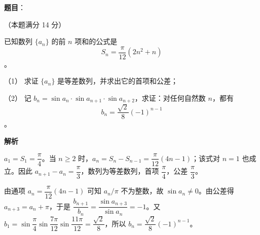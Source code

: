 \begin{answer}

\textbf{题目}：

（本题满分 14 分）

已知数列 $\{a_n\}$ 的前 $n$ 项和的公式是
\nopagebreak[4]
\[
S_n=\frac\pi{12}(2n^2+n)
\]
。

（1） 求证 $\{a_n\}$ 是等差数列，并求出它的首项和公差；

（2） 记 $b_n=\sin a_n\cdot\sin a_{n+1}\cdot\sin a_{n+2}$，求证：对任何自然数 $n$，都有
\nopagebreak[4]
\[
b_n=\frac{\sqrt2}{8}(-1)^{n-1}
\]
。

\textbf{解析}


$a_1=S_1=\dfrac\pi4$。当 $n\ge2$ 时，$a_n=S_n-S_{n-1}=\dfrac\pi{12}(4n-1)$；该式对 $n=1$ 也成立。因此 $a_{n+1}-a_n=\dfrac\pi3$，数列为等差数列，首项 $\dfrac\pi4$，公差 $\dfrac\pi3$。


由通项 $a_n=\dfrac\pi{12}(4n-1)$ 可知 $a_n/\pi$ 不为整数，故 $\sin a_n\ne0$。由公差得 $a_{n+3}=a_n+\pi$，于是 $\dfrac{b_{n+1}}{b_n}=\dfrac{\sin a_{n+3}}{\sin a_n}=-1$。又 $b_1=\sin\dfrac\pi4\sin\dfrac{7\pi}{12}\sin\dfrac{11\pi}{12}=\dfrac{\sqrt2}{8}$，所以 $b_n=\dfrac{\sqrt2}{8}(-1)^{n-1}$。



\end{answer}
